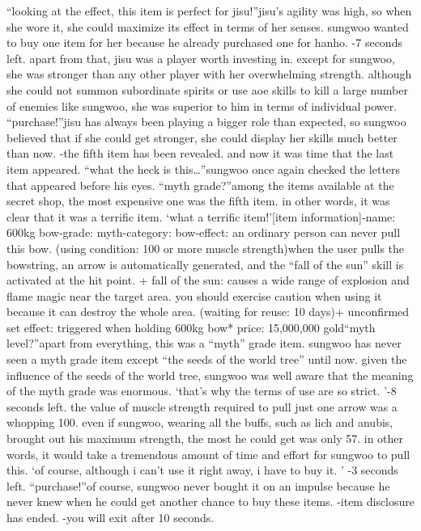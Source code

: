 “looking at the effect, this item is perfect for jisu!”jisu’s agility was high, so when she wore it, she could maximize its effect in terms of her senses.
sungwoo wanted to buy one item for her because he already purchased one for hanho.
-7 seconds left.
apart from that, jisu was a player worth investing in.
 except for sungwoo, she was stronger than any other player with her overwhelming strength.
although she could not summon subordinate spirits or use aoe skills to kill a large number of enemies like sungwoo, she was superior to him in terms of individual power.
“purchase!”jisu has always been playing a bigger role than expected, so sungwoo believed that if she could get stronger, she could display her skills much better than now.
-the fifth item has been revealed.
and now it was time that the last item appeared.
“what the heck is this…”sungwoo once again checked the letters that appeared before his eyes.
“myth grade?”among the items available at the secret shop, the most expensive one was the fifth item.
in other words, it was clear that it was a terrific item.
‘what a terrific item!’[item information]-name: 600kg bow-grade: myth-category: bow-effect: an ordinary person can never pull this bow.
 (using condition: 100 or more muscle strength)when the user pulls the bowstring, an arrow is automatically generated, and the “fall of the sun” skill is activated at the hit point.
+ fall of the sun: causes a wide range of explosion and flame magic near the target area.
 you should exercise caution when using it because it can destroy the whole area.
 (waiting for reuse: 10 days)+ unconfirmed set effect: triggered when holding 600kg bow* price: 15,000,000 gold“myth level?”apart from everything, this was a “myth” grade item.
 sungwoo has never seen a myth grade item except “the seeds of the world tree” until now.
given the influence of the seeds of the world tree, sungwoo was well aware that the meaning of the myth grade was enormous.
‘that’s why the terms of use are so strict.
’-8 seconds left.
the value of muscle strength required to pull just one arrow was a whopping 100.
 even if sungwoo, wearing all the buffs, such as lich and anubis, brought out his maximum strength, the most he could get was only 57.
in other words, it would take a tremendous amount of time and effort for sungwoo to pull this.
‘of course, although i can’t use it right away, i have to buy it.
’
-3 seconds left.
“purchase!”of course, sungwoo never bought it on an impulse because he never knew when he could get another chance to buy these items.
-item disclosure has ended.
-you will exit after 10 seconds.
